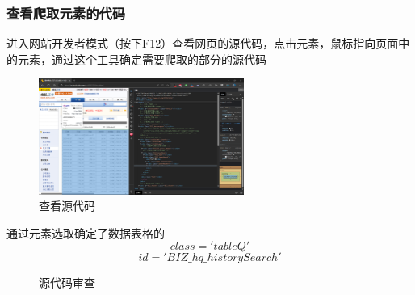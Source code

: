 \documentclass[UTF8,12pt]{article}
\begin{document}
\subsubsection{查看爬取元素的代码}
进入网站开发者模式（按下F12）查看网页的源代码，点击元素，鼠标指向页面中的元素，通过这个工具确定需要爬取的部分的源代码
\begin{figure}[htbp]
    \centering
    \includegraphics[width=0.6\textwidth]{img/3.png}
    \caption{查看源代码}
\end{figure}

通过元素选取确定了数据表格的
$$class='tableQ'$$
$$id='BIZ\_hq\_historySearch'$$

\begin{figure}[htbp]
    \centering
    \caption{源代码审查}
\end{figure}
\end{document}
